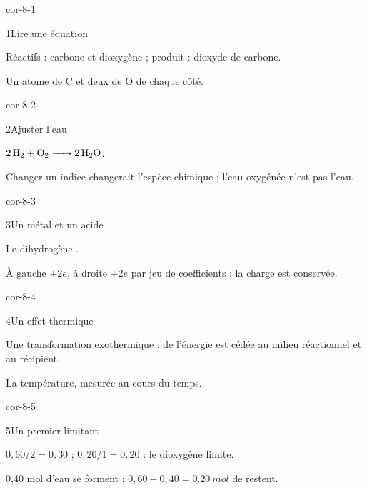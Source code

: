 \clearpage{}
\corrigesSouples
\begin{blocLivre}{cor-8-1}\begin{corrige}{1}{Lire une équation}
\begin{questions}
\item Réactifs : carbone et dioxygène ; produit : dioxyde de carbone.
\item Un atome de C et deux de O de chaque côté.
\end{questions}
\end{corrige}\end{blocLivre}
\begin{blocLivre}{cor-8-2}\begin{corrige}{2}{Ajuster l’eau}
\begin{questions}
\item $\ce{2 H2 + O2 -> 2 H2O}$.
\item Changer un indice changerait l’espèce chimique ; l’eau oxygénée n’est pas l’eau.
\end{questions}
\end{corrige}\end{blocLivre}
\begin{blocLivre}{cor-8-3}\begin{corrige}{3}{Un métal et un acide}
\begin{questions}
\item Le dihydrogène .
\item À gauche $+2e$, à droite $+2e$ par jeu de coefficients ; la charge est conservée.
\end{questions}
\end{corrige}\end{blocLivre}
\begin{blocLivre}{cor-8-4}\begin{corrige}{4}{Un effet thermique}
\begin{questions}
\item Une transformation exothermique : de l’énergie est cédée au milieu réactionnel et au récipient.
\item La température, mesurée au cours du temps.
\end{questions}
\end{corrige}\end{blocLivre}
\begin{blocLivre}{cor-8-5}\begin{corrige}{5}{Un premier limitant}
\begin{questions}
\item $0,60/2=0,30$ ; $0,20/1=0,20$ : le dioxygène limite.
\item 0,40 mol d’eau se forment ; $0,60-0,40=\qty{0,20}{mol}$ de  restent.
\end{questions}
\end{corrige}\end{blocLivre}
